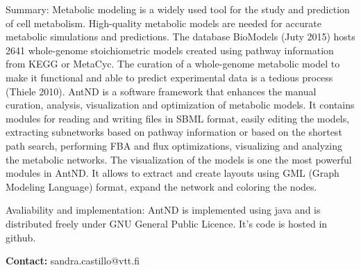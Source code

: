 Summary: Metabolic modeling is a widely used tool for the study and prediction of cell metabolism. High-quality metabolic models are needed for accurate metabolic simulations and predictions. The database BioModels (Juty 2015) hosts 2641 whole-genome stoichiometric models created using pathway information from KEGG or MetaCyc. The curation of a whole-genome metabolic model to make it functional and able to predict experimental data is a tedious process (Thiele 2010). AntND is a software framework that enhances the manual curation, analysis, visualization and optimization of metabolic models. It contains modules for reading and writing files in SBML format, easily editing the models, extracting subnetworks based on pathway information or based on the shortest path search, performing FBA and flux optimizations, visualizing and analyzing the metabolic networks. The visualization of the models is one the most powerful modules in AntND. It allows to extract and create layouts using GML (Graph Modeling Language) format, expand the network and coloring the nodes.

Avaliability and implementation: AntND is implemented using java and is distributed freely under GNU General Public Licence. It’s code is hosted in github.

\textbf{Contact:} sandra.castillo@vtt.fi

